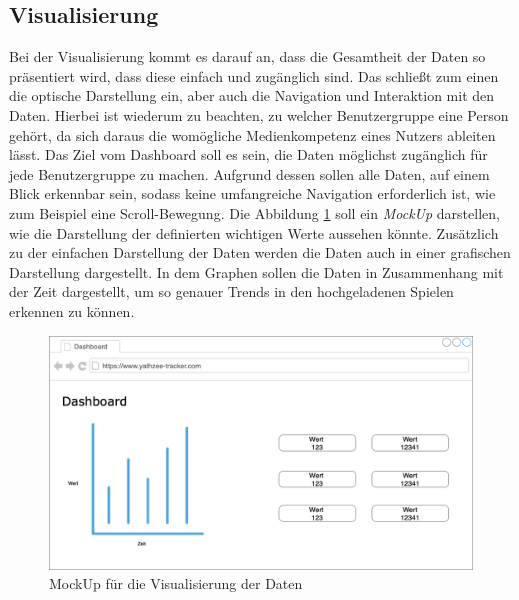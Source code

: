 \subsection{Visualisierung} \label{sec:visualisation}
Bei der Visualisierung kommt es darauf an, dass die Gesamtheit der Daten so präsentiert wird, dass diese einfach und zugänglich sind. Das schließt zum einen die optische Darstellung ein, aber auch die Navigation und Interaktion mit den Daten. Hierbei ist wiederum zu beachten, zu welcher Benutzergruppe eine Person gehört, da sich daraus die womögliche Medienkompetenz eines Nutzers ableiten lässt. \cite{few_2013}
Das Ziel vom Dashboard soll es sein, die Daten möglichst zugänglich für jede Benutzergruppe zu machen. Aufgrund dessen sollen alle Daten, auf einem Blick erkennbar sein, sodass keine umfangreiche Navigation erforderlich ist, wie zum Beispiel eine Scroll-Bewegung.
Die Abbildung \ref{fig:mockup} soll ein \textit{MockUp} darstellen, wie die Darstellung der definierten wichtigen Werte aussehen könnte.
Zusätzlich zu der einfachen Darstellung der Daten werden die Daten auch in einer grafischen Darstellung dargestellt. In dem Graphen sollen die Daten in Zusammenhang mit der Zeit dargestellt, um so genauer Trends in den hochgeladenen Spielen erkennen zu können.

\begin{figure}[H]
	\centering
	\includegraphics[width=\imgMed]{images/practice/dashboard_mockup.png}
	\caption{MockUp für die Visualisierung der Daten}
	\label{fig:mockup}
\end{figure}
